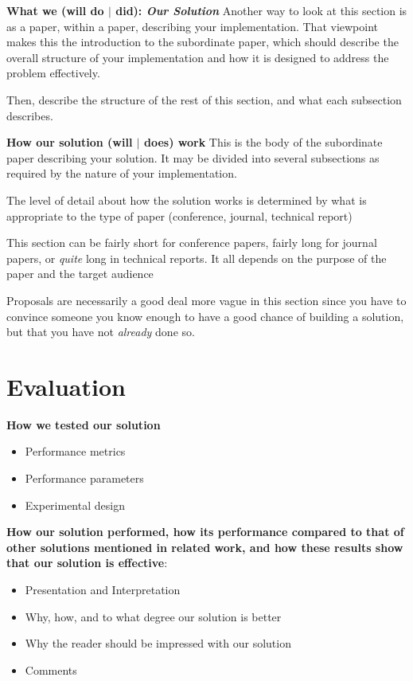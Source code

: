 \documentclass[pdf,bookmarks,colorlinks=true]{IEEEtran}
\begin{document}
\textbf{What we (will do $|$ did): {\em Our Solution}} Another way to look at this section is as a paper, within a paper, describing your implementation. That viewpoint makes this the introduction to the subordinate paper, which should describe the overall structure of your implementation and how it is designed to address the problem effectively.

Then, describe the structure of the rest of this section, and what each subsection describes.


\textbf{How our solution (will $|$ does) work} This is the body of the subordinate paper describing your solution. It may be divided into several subsections as required by the nature of your implementation.

The level of detail about how the solution works is determined by what is appropriate to the type of paper (conference, journal, technical report)

This section can be fairly short for conference papers, fairly long for journal papers, or {\em quite} long in technical reports. It all depends on the purpose of the paper and the target audience

Proposals are necessarily a good deal more vague in this section since you have to convince someone you know enough to have a good chance of building a solution, but that you have not {\em already} done so.

\section{Evaluation}\label{sec:Evaluation}

\textbf{How we tested our solution}
\begin{itemize}
\item   Performance metrics
\item   Performance parameters
\item   Experimental design
\end{itemize}

\textbf{How our solution performed, how its performance compared to that of other solutions mentioned in related work, and how these results show that our solution is effective}:

\begin{itemize}
\item   Presentation and Interpretation
\item   Why, how, and to what degree our solution is better
\item   Why the reader should be impressed with our solution
\item   Comments
\end{itemize}
\end{document}
